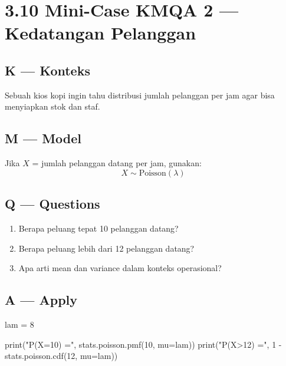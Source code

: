 \documentclass[
  letterpaper,
  DIV=11,
  numbers=noendperiod]{scrreprt}
\newenvironment{Shaded}{\begin{snugshade}}{\end{snugshade}}
\newcommand{\BuiltInTok}[1]{\textcolor[rgb]{0.00,0.23,0.31}{#1}}
\newcommand{\DecValTok}[1]{\textcolor[rgb]{0.68,0.00,0.00}{#1}}
\newcommand{\NormalTok}[1]{\textcolor[rgb]{0.00,0.23,0.31}{#1}}
\newcommand{\OperatorTok}[1]{\textcolor[rgb]{0.37,0.37,0.37}{#1}}
\newcommand{\StringTok}[1]{\textcolor[rgb]{0.13,0.47,0.30}{#1}}
\providecommand{\tightlist}{%
  \setlength{\itemsep}{0pt}\setlength{\parskip}{0pt}}
\begin{document}
\section{3.10 Mini-Case KMQA 2 --- Kedatangan
Pelanggan}\label{mini-case-kmqa-2-kedatangan-pelanggan}

\subsection{K --- Konteks}\label{k-konteks-17}

Sebuah kios kopi ingin tahu distribusi jumlah pelanggan per jam agar
bisa menyiapkan stok dan staf.

\subsection{M --- Model}\label{m-model-17}

Jika \(X\) = jumlah pelanggan datang per jam, gunakan: \[
X \sim \text{Poisson}(\lambda)
\]

\subsection{Q --- Questions}\label{q-questions-17}

\begin{enumerate}
\def\labelenumi{\arabic{enumi}.}
\tightlist
\item
  Berapa peluang tepat 10 pelanggan datang?
\item
  Berapa peluang lebih dari 12 pelanggan datang?
\item
  Apa arti mean dan variance dalam konteks operasional?
\end{enumerate}

\subsection{A --- Apply}\label{a-apply-17}

\begin{Shaded}
\begin{Highlighting}[]
\NormalTok{lam }\OperatorTok{=} \DecValTok{8}

\BuiltInTok{print}\NormalTok{(}\StringTok{"P(X=10) ="}\NormalTok{, stats.poisson.pmf(}\DecValTok{10}\NormalTok{, mu}\OperatorTok{=}\NormalTok{lam))}
\BuiltInTok{print}\NormalTok{(}\StringTok{"P(X\textgreater{}12) ="}\NormalTok{, }\DecValTok{1} \OperatorTok{{-}}\NormalTok{ stats.poisson.cdf(}\DecValTok{12}\NormalTok{, mu}\OperatorTok{=}\NormalTok{lam))}
\end{Highlighting}
\end{Shaded}
\end{document}
